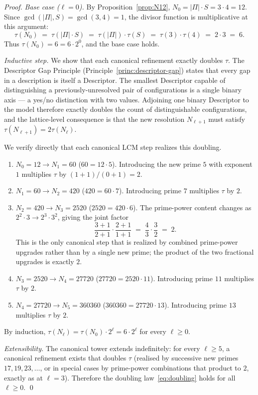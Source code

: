 \documentclass[11pt,a4paper]{article}
\theoremstyle{definition}
\theoremstyle{remark}
\begin{document}
\begin{proof}
\emph{Base case ($\ell=0$).} By Proposition~\ref{prop:N12}, $N_{0} = |\Pi|\cdot S = 3\cdot 4 = 12$. Since $\gcd(|\Pi|, S) = \gcd(3,4) = 1$, the divisor function is multiplicative at this argument:
\[
\tau(N_{0}) \;=\; \tau(|\Pi|\cdot S) \;=\; \tau(|\Pi|)\cdot \tau(S) \;=\; \tau(3)\cdot \tau(4) \;=\; 2\cdot 3 \;=\; 6.
\]
Thus $\tau(N_{0}) = 6 = 6\cdot 2^{0}$, and the base case holds.

\emph{Inductive step.} We show that each canonical refinement exactly doubles $\tau$. The Descriptor Gap Principle (Principle~\ref{princ:descriptor-gap}) states that every gap in a description is itself a Descriptor. The smallest Descriptor capable of distinguishing a previously-unresolved pair of configurations is a single binary axis --- a yes/no distinction with two values. Adjoining one binary Descriptor to the model therefore exactly doubles the count of distinguishable configurations, and the lattice-level consequence is that the new resolution $N_{\ell+1}$ must satisfy $\tau(N_{\ell+1}) = 2\tau(N_{\ell})$.

We verify directly that each canonical LCM step realizes this doubling.
\begin{enumerate}[leftmargin=*]
\item \emph{$N_{0}=12 \to N_{1}=60$} ($60 = 12\cdot 5$). Introducing the new prime $5$ with exponent $1$ multiplies $\tau$ by $(1+1)/(0+1) = 2$.
\item \emph{$N_{1}=60 \to N_{2}=420$} ($420 = 60\cdot 7$). Introducing prime $7$ multiplies $\tau$ by $2$.
\item \emph{$N_{2}=420 \to N_{3}=2520$} ($2520 = 420 \cdot 6$). The prime-power content changes as $2^{2}\cdot 3 \to 2^{3}\cdot 3^{2}$, giving the joint factor
\[
\frac{3+1}{2+1}\cdot\frac{2+1}{1+1} \;=\; \frac{4}{3}\cdot\frac{3}{2} \;=\; 2.
\]
This is the only canonical step that is realized by combined prime-power upgrades rather than by a single new prime; the product of the two fractional upgrades is exactly $2$.
\item \emph{$N_{3}=2520 \to N_{4}=27720$} ($27720 = 2520\cdot 11$). Introducing prime $11$ multiplies $\tau$ by $2$.
\item \emph{$N_{4}=27720 \to N_{5}=360360$} ($360360 = 27720\cdot 13$). Introducing prime $13$ multiplies $\tau$ by $2$.
\end{enumerate}
By induction, $\tau(N_{\ell}) = \tau(N_{0})\cdot 2^{\ell} = 6\cdot 2^{\ell}$ for every $\ell\ge 0$.

\emph{Extensibility.} The canonical tower extends indefinitely: for every $\ell\ge 5$, a canonical refinement exists that doubles $\tau$ (realised by successive new primes $17,19,23,\ldots$, or in special cases by prime-power combinations that product to $2$, exactly as at $\ell=3$). Therefore the doubling law~\eqref{eq:doubling} holds for all $\ell\ge 0$. \qed
\end{proof}
\end{document}
